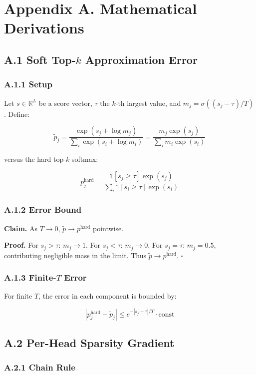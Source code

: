 
\section{Appendix A. Mathematical Derivations}

\subsection{A.1 Soft Top-$k$ Approximation Error}

\subsubsection{A.1.1 Setup}

Let $s \in \mathbb{R}^L$ be a score vector, $\tau$ the $k$-th largest 
value, and $m_j = \sigma((s_j - \tau) / T)$. Define:

\[
\tilde{p}_j = \frac{\exp(s_j + \log m_j)}{\sum_i \exp(s_i + \log m_i)} = \frac{m_j \exp(s_j)}{\sum_i m_i \exp(s_i)}
\]

versus the hard top-$k$ softmax:

\[
p_j^{\text{hard}} = \frac{\mathbb{1}[s_j \ge \tau] \exp(s_j)}{\sum_i \mathbb{1}[s_i \ge \tau] \exp(s_i)}
\]

\subsubsection{A.1.2 Error Bound}

\textbf{Claim.} As $T \to 0$, $\tilde{p} \to p^{\text{hard}}$ pointwise.

\textbf{Proof.} For $s_j > \tau$: $m_j \to 1$. For $s_j < \tau$: $m_j \to 0$. 
For $s_j = \tau$: $m_j = 0.5$, contributing negligible mass in the limit. 
Thus $\tilde{p} \to p^{\text{hard}}$. $\square$

\subsubsection{A.1.3 Finite-$T$ Error}

For finite $T$, the error in each component is bounded by:

\[
|p_j^{\text{hard}} - \tilde{p}_j| \leq e^{-|s_j - \tau| / T} \cdot \text{const}
\]

\subsection{A.2 Per-Head Sparsity Gradient}

\subsubsection{A.2.1 Chain Rule}

